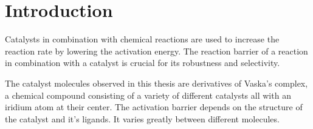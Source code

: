 
\chapter{Introduction}
\label{ch:Introduction}


Catalysts in combination with chemical reactions are used to increase the reaction rate by lowering the activation energy.
The reaction barrier of a reaction in combination with a catalyst is crucial for its robustness and selectivity.

The catalyst molecules observed in this thesis are derivatives of Vaska's complex, a chemical compound consisting of a variety of different catalysts all with an iridium atom at their center.
The activation barrier depends on the structure of the catalyst and it's ligands.
It varies greatly between different molecules.

